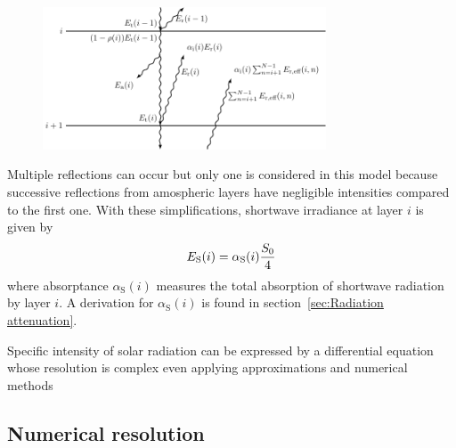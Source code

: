 \documentclass[a4paper,10pt,twocolumn,\classoptions]{article}
\begin{document}
\begin{figure}[h]
  \centering
  \includegraphics*[keepaspectratio=true,width=0.75\textwidth]{shortwave_radiation}
  \caption{} %
  \label{fig:shortwave_radiation}
\end{figure}
Multiple reflections can occur but only one is considered in this model because successive reflections from amospheric layers have negligible intensities compared to the first one.
With these simplifications, shortwave irradiance at layer $i$ is given by
\begin{equation}
  \label{eq:irradiance_shortwave}
  E_\text{S}(i) = \alpha_\text{S}(i) \frac{S_0}{4}
\end{equation}
where absorptance $\alpha_\text{S}(i)$ measures the total absorption of shortwave radiation by layer $i$. A derivation for $\alpha_\text{S}(i)$ is found in section~\ref{sec:Radiation attenuation}.


Specific intensity of solar radiation can be expressed by a differential equation whose resolution is complex even applying approximations and numerical methods



\subsection{Numerical resolution}
\label{sec:Numerical resolution}
\end{document}
